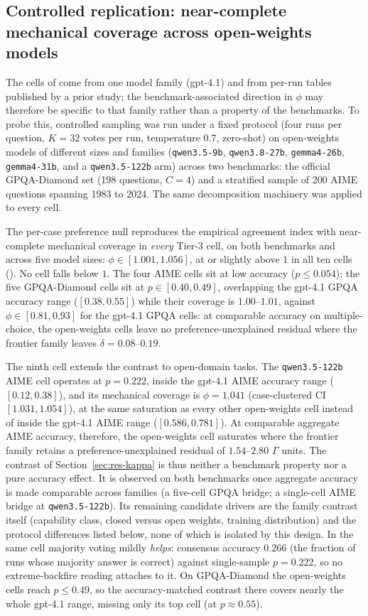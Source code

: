\documentclass[a4paper,fleqn]{cas-sc}
\newcommand{\agreementIndex}{\Gamma}
\begin{document}
\subsection{Controlled replication: near-complete mechanical coverage across open-weights models}
\label{sec:res-tier3}

The cells of  come from one model family (gpt-4.1) and
from per-run tables published by a prior study; the benchmark-associated
direction in $\phi$ may therefore be specific to that family rather than
a property of the benchmarks. To probe this, controlled sampling was run
under a fixed protocol (four runs per question, $K=32$ votes per run,
temperature $0.7$, zero-shot) on open-weights models of different
sizes and families (\texttt{qwen3.5-9b}, \texttt{qwen3.8-27b},
\texttt{gemma4-26b}, \texttt{gemma4-31b}, and a \texttt{qwen3.5-122b}
arm) across two benchmarks: the official
GPQA-Diamond set (198 questions, $C=4$) and a stratified sample of 200
AIME questions spanning 1983 to 2024. The same decomposition machinery
was applied to every cell.

The per-case preference null reproduces the empirical agreement index
with near-complete mechanical coverage in \emph{every} Tier-3 cell, on
both benchmarks and across five model sizes:
$\phi\in[1.001,1.056]$, at or slightly above $1$ in all ten cells
(). No cell falls below $1$. The four AIME cells sit at low accuracy
($p\le0.054$); the five GPQA-Diamond cells sit at
$p\in[0.40,0.49]$, overlapping the gpt-4.1 GPQA accuracy range
($[0.38,0.55]$) while their coverage is $1.00$--$1.01$, against
$\phi\in[0.81,0.93]$ for the gpt-4.1 GPQA cells: at comparable accuracy
on multiple-choice, the open-weights cells leave no
preference-unexplained residual where the frontier family leaves
$\delta=0.08$--$0.19$.

The ninth cell extends the contrast to open-domain tasks. The
\texttt{qwen3.5-122b} AIME cell operates at $p=0.222$, inside the
gpt-4.1 AIME accuracy range ($[0.12,0.38]$), and its mechanical coverage
is $\phi=1.041$ (case-clustered CI $[1.031,1.054]$), at the same
saturation as every other open-weights cell instead of inside the
gpt-4.1 AIME range ($[0.586,0.781]$). At comparable aggregate AIME accuracy,
therefore, the open-weights cell saturates where the frontier family
retains a preference-unexplained residual of $1.54$--$2.80$ $\agreementIndex$
units. The contrast of Section~\ref{sec:res-kappa} is thus neither a
benchmark property nor a pure accuracy effect. It is observed on both
benchmarks once aggregate accuracy is made comparable across families
(a five-cell GPQA bridge; a single-cell AIME bridge at \texttt{qwen3.5-122b}). Its remaining
candidate drivers are the family contrast itself (capability class,
closed versus open weights, training distribution) and the protocol
differences listed below, none of which is isolated by this design. In
the same cell majority voting mildly \emph{helps}: consensus accuracy
$0.266$ (the fraction of runs whose majority answer is correct)
against single-sample $p=0.222$, so no extreme-backfire reading
attaches to it. On
GPQA-Diamond the open-weights cells reach $p\le0.49$, so the
accuracy-matched contrast there covers nearly the whole gpt-4.1 range,
missing only its top cell (at $p\approx0.55$).
\end{document}
